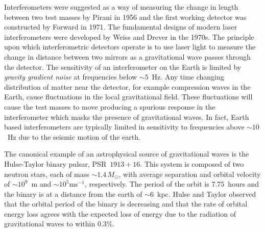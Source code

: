 Interferometers were suggested as a way of measuring the change in 
length between two test masses by Pirani in 1956\cite{Pirani:1956} and
the first working detector was constructed by Forward in
1971\cite{Forward:1971}. The fundamental designs of modern laser
interferometers were developed by Weiss\cite{Weiss:1972} and
Drever\cite{Drever:1980} in the 1970s. The principle upon which
interferometric detectors operate is to use laser light to measure the change
in distance between two mirrors as a gravitational wave passes through the
detector.  The sensitivity of an interferometer on the Earth is limited by
\emph{gravity gradient noise} at frequencies below $\sim
5$~Hz\cite{Saulson:1994}.  Any time changing distribution of matter near the
detector, for example compression waves in the Earth, cause fluctuations in
the local gravitational field. These fluctuations will cause the test masses
to move producing a spurious response in the interferometer which masks the
presence of gravitational waves. In fact, Earth based interferometers are
typically limited in sensitivity to frequencies above $\sim 10$~Hz due to the
seismic motion of the earth.


The canonical example of an astrophysical source of gravitational waves is the
Hulse-Taylor binary pulsar, PSR~$1913+16$\cite{1975ApJ...195L..51H}. This
system is composed of two neutron stars, each of mass $\sim 1.4\,M_\odot$,
with average separation and orbital velocity of $\sim10^9$~m and $\sim
10^5$ms$^{-1}$, respectively. The period of the orbit is $7.75$~hours and the
binary is at a distance from the earth of $\sim 6$~kpc.  Hulse and Taylor
observed that the orbital period of the binary is decreasing and that the rate
of orbital energy loss agrees with the expected loss of energy due to the
radiation of gravitational waves to within
$0.3\%$\cite{Taylor:1982,Taylor:1989}.

